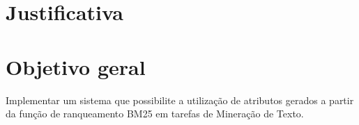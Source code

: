     
    
    
    

    




    \section{Justificativa} \label{sec:Justificativa}


    \section{Objetivo geral} \label{sec:Objetivo-geral}
        Implementar um sistema que possibilite a utilização de atributos gerados a partir da função de ranqueamento BM25 em tarefas de Mineração de Texto.

